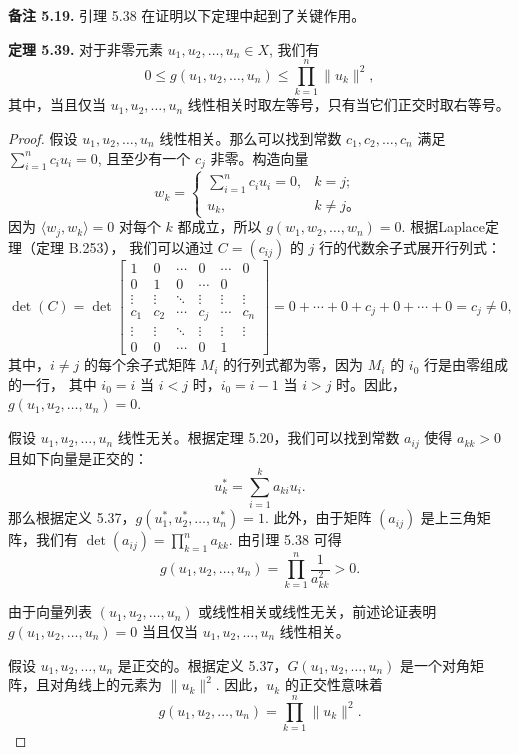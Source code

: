 \documentclass[a4paper]{ctexart}
\begin{document}
{\noindent \textbf{备注 5.19.} 引理 5.38 在证明以下定理中起到了关键作用。

\noindent \textbf{定理 5.39.} 对于非零元素 $u_1, u_2, \ldots, u_n \in X$, 我们有
\[
  0 \leq g(u_1, u_2, \ldots, u_n) \leq \prod_{k=1}^n \|u_k\|^2,
\]
其中，当且仅当 $u_1, u_2, \ldots, u_n$ 线性相关时取左等号，只有当它们正交时取右等号。

\begin{proof}
假设 $u_1, u_2, \ldots, u_n$ 线性相关。那么可以找到常数 $c_1, c_2, \ldots, c_n$ 满足 $\sum_{i=1}^n c_i u_i = 0$, 且至少有一个 $c_j$ 非零。构造向量
\[
  w_k = \begin{cases}
    \sum_{i=1}^n c_i u_i = 0, & k = j; \\
    u_k, & k \neq j。
  \end{cases}
\]
因为 $\langle w_j, w_k \rangle = 0$ 对每个 $k$ 都成立，所以 $g(w_1, w_2, \ldots, w_n) = 0$. 根据Laplace定理（定理 B.253），
我们可以通过 $C = (c_{ij})$ 的 $j$ 行的代数余子式展开行列式：
\[
  \det(C) = \det \begin{bmatrix}
    1 & 0 & \cdots & 0 & \cdots & 0 \\
    0 & 1 & 0 & \cdots & 0 \\
    \vdots & \vdots & \ddots & \vdots & \vdots & \vdots \\
    c_1 & c_2 & \cdots & c_j & \cdots & c_n \\
    \vdots & \vdots & \ddots & \vdots & \vdots & \vdots \\
    0 & 0 & \cdots & 0 & 1
  \end{bmatrix}
= 0 + \cdots + 0 + c_j + 0 + \cdots + 0 = c_j \neq 0,
\]
其中，$i \neq j$ 的每个余子式矩阵 $M_i$ 的行列式都为零，因为 $M_i$ 的 $i_0$ 行是由零组成的一行，
其中 $i_0 = i$ 当 $i < j$ 时，$i_0 = i - 1$ 当 $i > j$ 时。因此，$g(u_1, u_2, \ldots, u_n) = 0$.

假设 $u_1, u_2, \ldots, u_n$ 线性无关。根据定理 5.20，我们可以找到常数 $a_{ij}$ 使得 $a_{kk} > 0$ 且如下向量是正交的：
\[
  u_k^* = \sum_{i=1}^k a_{ki} u_i.
\]
那么根据定义 5.37，$g(u_1^*, u_2^*, \ldots, u_n^*) = 1$. 
此外，由于矩阵 $(a_{ij})$ 是上三角矩阵，我们有 $\det (a_{ij}) = \prod_{k=1}^n a_{kk}$. 由引理 5.38 可得
\[
  g(u_1, u_2, \ldots, u_n) = \prod_{k=1}^n \frac{1}{a_{kk}^2} > 0.
\]

由于向量列表 $(u_1, u_2, \ldots, u_n)$ 或线性相关或线性无关，前述论证表明 $g(u_1, u_2, \ldots, u_n) = 0$ 当且仅当 $u_1, u_2, \ldots, u_n$ 线性相关。

假设 $u_1, u_2, \ldots, u_n$ 是正交的。根据定义 5.37，$G(u_1, u_2, \ldots, u_n)$ 是一个对角矩阵，且对角线上的元素为 $\|u_k\|^2$. 
因此，$u_k$ 的正交性意味着
\[
  g(u_1, u_2, \ldots, u_n) = \prod_{k=1}^n \|u_k\|^2.
\]
\end{proof}

}
\end{document}
